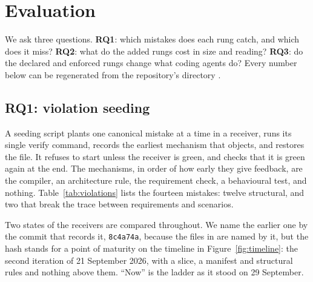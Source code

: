 \section{Evaluation}\label{sec:evaluation}

We ask three questions. \textbf{RQ1}: which mistakes does each rung catch, and which does it
miss? \textbf{RQ2}: what do the added rungs cost in size and reading? \textbf{RQ3}: do the
declared and enforced rungs change what coding agents do? Every number below can be regenerated
from the repository's  directory \citep{taskboardrepo}.

\subsection{RQ1: violation seeding}

A seeding script plants one canonical mistake at a time in a receiver, runs its single verify
command, records the earliest mechanism that objects, and restores the file. It refuses to start
unless the receiver is green, and checks that it is green again at the end. The mechanisms, in
order of how early they give feedback, are the compiler, an architecture rule, the requirement
check, a behavioural test, and nothing. Table~\ref{tab:violations} lists the fourteen mistakes:
twelve structural, and two that break the trace between requirements and scenarios.

Two states of the receivers are compared throughout. We name the earlier one by the commit that
records it, \texttt{8c4a74a}, because the files in  are named by it, but the
hash stands for a point of maturity on the timeline in Figure~\ref{fig:timeline}: the second
iteration of 21 September 2026, with a slice, a manifest and structural rules and nothing above
them. ``Now'' is the ladder as it stood on 29 September.

